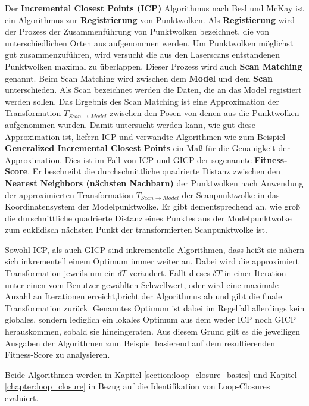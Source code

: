 Der \textbf{Incremental Closest Points (ICP)} Algorithmus nach Besl und McKay \cite{Besl:1992} ist ein Algorithmus zur \textbf{Registrierung} von Punktwolken.
Als \textbf{Registierung} wird der Prozess der Zusammenführung von Punktwolken bezeichnet, die von unterschiedlichen Orten aus aufgenommen werden. Um Punktwolken möglichst gut zusammenzuführen, wird versucht die aus den Laserscans entstandenen Punktwolken maximal zu überlappen. Dieser Prozess wird auch \textbf{Scan Matching} genannt.
Beim Scan Matching wird zwischen dem \textbf{Model} und dem \textbf{Scan} unterschieden.
Als Scan bezeichnet werden die Daten, die an das Model registiert werden sollen.
Das Ergebnis des Scan Matching ist eine Approximation der Transformation $T_{Scan \rightarrow Model}$ zwischen den Posen von denen aus die Punktwolken aufgenommen wurden.
Damit untersucht werden kann, wie gut diese Approximation ist, liefern ICP und verwandte Algorithmen wie zum Beispiel \textbf{Generalized Incremental Closest Points} \cite{segal2009generalized} ein Maß für die Genauigkeit der Approximation. Dies ist im Fall von ICP und GICP der sogenannte \textbf{Fitness-Score}. Er beschreibt die durchschnittliche quadrierte Distanz zwischen den \textbf{Nearest Neighbors (nächsten Nachbarn)} der Punktwolken nach Anwendung der approximierten Transformation $T_{Scan \rightarrow Model}$ der Scanpunktwolke in das Koordinatensystem der Modelpunktwolke.
Er gibt dementsprechend an, wie groß die durschnittliche quadrierte Distanz eines Punktes aus der Modelpunktwolke zum euklidisch nächsten Punkt der transformierten Scanpunktwolke ist.

Sowohl ICP, als auch GICP sind inkrementelle Algorithmen, dass heißt sie nähern sich inkrementell einem Optimum immer weiter an. Dabei wird die approximiert Transformation jeweils um ein $\delta T$ verändert. Fällt dieses $\delta T$ in einer Iteration unter einen vom Benutzer gewählten Schwellwert, oder wird eine maximale Anzahl an Iterationen erreicht,bricht der Algorithmus ab und gibt die finale Transformation zurück.
Genanntes Optimum ist dabei im Regelfall allerdings kein globales, sondern lediglich ein lokales Optimum aus dem weder ICP noch GICP herauskommen, sobald sie hineingeraten.
Aus diesem Grund gilt es die jeweiligen Ausgaben der Algorithmen zum Beispiel basierend auf dem resultierenden Fitness-Score zu analysieren. 

Beide Algorithmen werden in Kapitel \ref{section:loop_closure_basics} und Kapitel \ref{chapter:loop_closure} in Bezug auf die Identifikation von Loop-Closures evaluiert.

